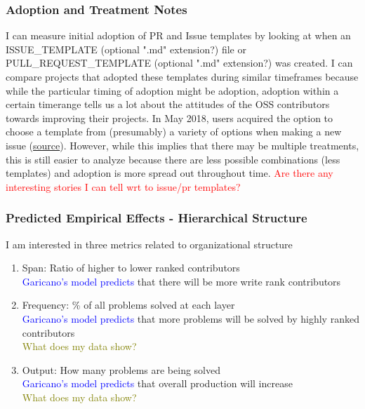 \documentclass[source/paper/main.tex]{subfiles}
\begin{document}
\subsubsection{Adoption and Treatment Notes}
I can measure initial adoption of PR and Issue templates by looking at when an ISSUE\_TEMPLATE (optional ".md" extension?) file or PULL\_REQUEST\_TEMPLATE (optional ".md" extension?) was created. I can compare projects that adopted these templates during similar timeframes because while the particular timing of adoption might be adoption, adoption within a certain timerange tells us a lot about the attitudes of the OSS contributors towards improving their projects. In May 2018, users acquired the option to choose a template from (presumably) a variety of options when making a new issue (\href{https://github.blog/changelog/2018-05-02-mutiple-template-choice/}{source}). However, while this implies that there may be multiple treatments, this is still easier to analyze because there are less possible combinations (less templates) and adoption is more spread out throughout time. 
\textcolor{red}{Are there any interesting stories I can tell wrt to issue/pr templates? }

\subsubsection{Predicted Empirical Effects - Hierarchical Structure}
I am interested in three metrics related to organizational structure
\begin{enumerate}
    \item Span: Ratio of higher to lower ranked contributors \\
    \textcolor{blue}{Garicano's model predicts} that there will be more write rank contributors\\    
    \item Frequency: \% of all problems solved at each layer\\
    \textcolor{blue}{Garicano's model predicts} that more problems will be solved by highly ranked contributors \\
    \textcolor{olive}{What does my data show?}
    \item Output: How many problems are being solved\\
    \textcolor{blue}{Garicano's model predicts} that overall production will increase \\
    \textcolor{olive}{What does my data show?}
\end{enumerate}
\end{document}
